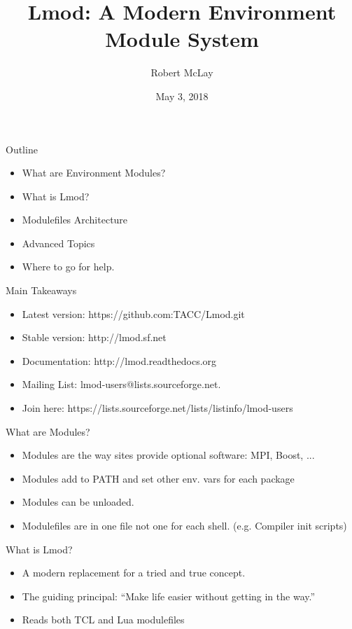 \documentclass{beamer}
\begin{document}
\title[Lmod]{Lmod: A Modern Environment Module System}
\author{Robert McLay} 
\date{May 3, 2018} 

\frame{\titlepage} 

\begin{frame}{Outline}
  \begin{itemize}
    \item What are Environment Modules?
    \item What is Lmod?
    \item Modulefiles Architecture
    \item Advanced Topics
    \item Where to go for help.
  \end{itemize}
\end{frame}

\begin{frame}{Main Takeaways}
  \begin{itemize}
    \item Latest version: https://github.com:TACC/Lmod.git
    \item Stable version: http://lmod.sf.net
    \item Documentation:  http://lmod.readthedocs.org
    \item Mailing List:   lmod-users@lists.sourceforge.net.
    \item Join here: https://lists.sourceforge.net/lists/listinfo/lmod-users
  \end{itemize}
\end{frame}

\begin{frame}{What are Modules?}
  \begin{itemize}
    \item Modules are the way sites provide optional software: MPI,
      Boost, ...
    \item Modules add to PATH and set other env. vars for each package
    \item Modules can be unloaded.
    \item Modulefiles are in one file not one for each shell. (e.g. Compiler init scripts)
  \end{itemize}
\end{frame}

\begin{frame}{What is Lmod?}
  \begin{itemize}
    \item A modern replacement for a tried and true concept.
    \item The guiding principal: ``Make life easier without getting in
      the way.''
    \item Reads both TCL and Lua modulefiles
  \end{itemize}
\end{frame}
\end{document}
